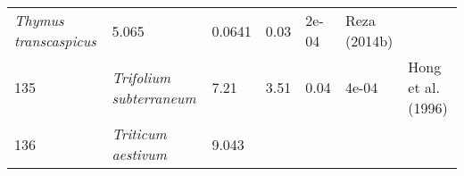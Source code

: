 \documentclass[]{article}
\begin{document}
\begin{longtable}[]{@{}lllllll@{}}
\begin{minipage}[t]{0.23\columnwidth}
\emph{Thymus transcaspicus}\strut
\end{minipage} & \begin{minipage}[t]{0.05\columnwidth}\raggedright
5.065\strut
\end{minipage} & \begin{minipage}[t]{0.08\columnwidth}\raggedright
0.0641\strut
\end{minipage} & \begin{minipage}[t]{0.08\columnwidth}\raggedright
0.03\strut
\end{minipage} & \begin{minipage}[t]{0.08\columnwidth}\raggedright
2e-04\strut
\end{minipage} & \begin{minipage}[t]{0.23\columnwidth}\raggedright
Reza (2014b)\strut
\end{minipage}\tabularnewline
\begin{minipage}[t]{0.05\columnwidth}\raggedright
135\strut
\end{minipage} & \begin{minipage}[t]{0.23\columnwidth}\raggedright
\emph{Trifolium subterraneum}\strut
\end{minipage} & \begin{minipage}[t]{0.05\columnwidth}\raggedright
7.21\strut
\end{minipage} & \begin{minipage}[t]{0.08\columnwidth}\raggedright
3.51\strut
\end{minipage} & \begin{minipage}[t]{0.08\columnwidth}\raggedright
0.04\strut
\end{minipage} & \begin{minipage}[t]{0.08\columnwidth}\raggedright
4e-04\strut
\end{minipage} & \begin{minipage}[t]{0.23\columnwidth}\raggedright
Hong et al. (1996)\strut
\end{minipage}\tabularnewline
\begin{minipage}[t]{0.05\columnwidth}\raggedright
136\strut
\end{minipage} & \begin{minipage}[t]{0.23\columnwidth}\raggedright
\emph{Triticum aestivum}\strut
\end{minipage} & \begin{minipage}[t]{0.05\columnwidth}\raggedright
9.043\strut
\end{minipage} & \begin{minipage}[t]{0.08\columnwidth}\raggedright

\end{minipage}
\end{longtable}
\end{document}
